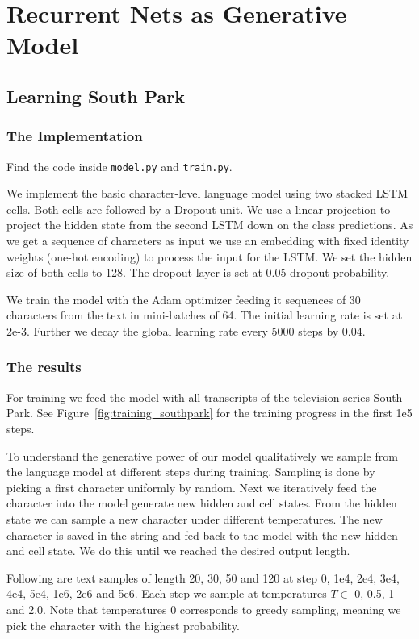 \documentclass{article}
\begin{document}
\section{Recurrent Nets as Generative Model}
\subsection{Learning South Park}
\subsubsection{The Implementation}
Find the code inside \texttt{model.py} and \texttt{train.py}.

We implement the basic character-level language model using two stacked LSTM cells.
Both cells are followed by a Dropout unit.
We use a linear projection to project the hidden state from the second LSTM down on the class predictions.
As we get a sequence of characters as input we use an embedding with fixed identity weights (one-hot encoding) to process the input for the LSTM.
We set the hidden size of both cells to 128.
The dropout layer is set at 0.05 dropout probability.

We train the model with the Adam optimizer feeding it sequences of 30 characters from the text in mini-batches of 64.
The initial learning rate is set at 2e-3.
Further we decay the global learning rate every 5000 steps by 0.04.

\subsubsection{The results}
For training we feed the model with all transcripts of the television series South Park.
See Figure~\ref{fig:training_southpark} for the training progress in the first 1e5 steps.

To understand the generative power of our model qualitatively we sample from the language model at different steps during training.
Sampling is done by picking a first character uniformly by random.
Next we iteratively feed the character into the model generate new hidden and cell states.
From the hidden state we can sample a new character under different temperatures.
The new character is saved in the string and fed back to the model with the new hidden and cell state.
We do this until we reached the desired output length.

Following are text samples of length 20, 30, 50 and 120 at step 0, 1e4, 2e4, 3e4, 4e4, 5e4, 1e6, 2e6 and 5e6.
Each step we sample at temperatures \(T\in\) 0, 0.5, 1 and 2.0.
Note that temperatures 0 corresponds to greedy sampling, meaning we pick the character with the highest probability.
\end{document}
